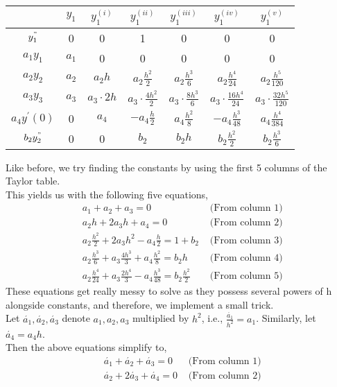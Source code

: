 \documentclass[letterpaper]{exam}
\begin{document}
\begin{questions}
\begin{parts}
\begin{solution}
\begin{center}
\begin{tabular}{|c|c|c|c|c|c|c|}
&$y_1$&$y_1^{(i)}$&$y_1^{(ii)}$&$y_1^{(iii)}$&$y_1^{(iv)}$&$y_1^{(v)}$\\
\hline

     $y_1^{"}$&0&0&1&0&0&0\\
\hline

     $a_1y_1$&$a_1$&0&0&0&0&0\\
\hline

     $a_2y_{2}$&$a_2$&$a_2h$&$a_2\frac{h^2}{2}$&$a_2\frac{h^3}{6}$&$a_2\frac{h^4}{24}$&$a_2\frac{h^5}{120}$\\
\hline
     $a_3y_{3}$&$a_3$&$a_3\cdot2h$&$a_3\cdot\frac{4h^2}{2}$&$a_3\cdot\frac{8h^3}{6}$&$a_3\cdot\frac{16h^4}{24}$&$a_3\cdot\frac{32h^5}{120}$\\
\hline
     $a_4y^{'}(0)$&0&$a_4$&$-a_4\frac{h}{2}$&$a_4\frac{h^2}{8}$&$-a_4\frac{h^3}{48}$&$a_4\frac{h^4}{384}$\\
\hline
     $b_2y_{2}^{"}$&0&0&$b_2$&$b_2h$&$b_2\frac{h^2}{2}$&$b_2\frac{h^3}{6}$\\
\hline
\end{tabular}
\end{center}
Like before, we try finding the constants by using the first 5 columns of the Taylor table.\\
This yields us with the following five equations,
\begin{align*}
    &a_1 + a_2 + a_3 = 0 &\mbox{ (From column 1) }\\
    &a_2h + 2a_3h + a_4 = 0 &\mbox{ (From column 2)}\\
    &a_2\frac{h^2}{2} + 2a_3h^2 - a_4\frac{h}{2}  = 1 +b_2 &\mbox{ (From column 3)}\\
    &a_2\frac{h^3}{6} + a_3\frac{4h^3}{3} + a_4\frac{h^2}{8} = b_2h &\mbox{ (From column 4)}\\
    &a_2\frac{h^4}{24} + a_3\frac{2h^4}{3} - a_4\frac{h^3}{48}= b_2\frac{h^2}{2} &\mbox{ (From column 5)}
\end{align*}
These equations get really messy to solve as they possess several powers of h alongside constants, and therefore, we implement a small trick.\\
Let $\acute{a_1},\acute{a_2},\acute{a_3}$ denote $a_1,a_2,a_3$ multiplied by $h^2$, i.e., $\frac{\acute{a_1}}{h^2} = a_1$. Similarly, let $\acute{a_4} = a_4h$.\\
Then the above equations simplify to,
\begin{align*}
    &\acute{a_1} + \acute{a_2} + \acute{a_3} = 0 &\mbox{ (From column 1) }\\
    &\acute{a_2} + 2\acute{a_3} + \acute{a_4} = 0 &\mbox{ (From column 2)}\\

\end{align*}
\end{solution}
\end{parts}
\end{questions}
\end{document}

